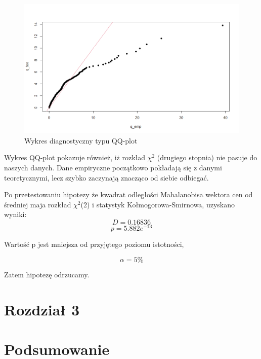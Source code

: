 \documentclass[a4paper,11pt]{article}
\def\\{\hfill\break}
\begin{document}
\begin{figure}[H]
    \includegraphics[width=13cm]{Wykresy/QQplot_Mahalanobis.png}
    \caption{Wykres diagnostyczny typu QQ-plot}
    \label{fig:mlp}
\end{figure}

Wykres QQ-plot pokazuje również, iż rozkład $\chi^2$ (drugiego stopnia) nie pasuje do naszych danych. Dane empiryczne początkowo pokładają się z danymi teoretycznymi, lecz szybko zaczynają znacząco od siebie odbiegać.
\\

Po przetestowaniu hipotezy że kwadrat odległości Mahalanobisa wektora cen od średniej maja rozkład $\chi^2$(2) i statystyk Kołmogorowa-Smirnowa, uzyskano wyniki:
  $$ D = 0.16836 $$
  $$ p = 5.882e^{-13} $$ 

Wartość p jest mniejsza od przyjętego poziomu istotności,

   $$ \alpha  = 5\%$$

Zatem hipotezę odrzucamy.


\section{Rozdział 3}
\section{Podsumowanie}
\end{document}
